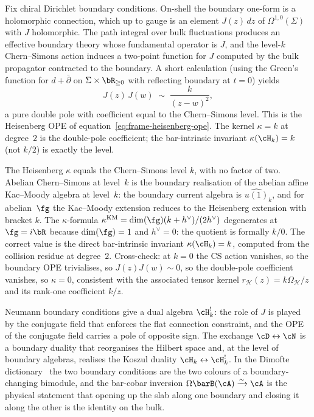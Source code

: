 Fix chiral Dirichlet boundary conditions. On-shell the
boundary one-form is a holomorphic connection, which up to gauge
is an element $J(z)\,dz$ of $\Omega^{1,0}(\Sigma)$ with $J$
holomorphic. The path integral over bulk fluctuations produces an
effective boundary theory whose fundamental operator is $J$, and
the level-$k$ Chern--Simons action induces a two-point function for
$J$ computed by the bulk propagator contracted to the boundary. A
short calculation (using the Green's function for $d + \bar\partial$
on $\Sigma \times \bR_{\ge 0}$ with reflecting boundary at $t = 0$)
yields
\begin{equation}\label{eq:cs-hinge-JJ-OPE}
J(z)\,J(w)
\;\sim\;
\frac{k}{(z - w)^2},
\end{equation}
a pure double pole with coefficient equal to the Chern--Simons
level. This is the Heisenberg OPE of
equation~\eqref{eq:frame-heisenberg-ope}. The kernel
$\kappa = k$ at degree~$2$ is the double-pole coefficient; the
bar-intrinsic invariant $\kappa(\cH_k) = k$ (not $k/2$) is
exactly the level.

\begin{remark}
\label{rem:cs-hinge-level}
The Heisenberg $\kappa$ equals the Chern--Simons level $k$, with
no factor of two. Abelian Chern--Simons at level~$k$ is the
boundary realisation of the abelian affine Kac--Moody algebra at
level~$k$: the boundary current algebra is $\widehat{u(1)}_k$,
and for abelian~$\fg$ the Kac--Moody extension reduces to the
Heisenberg extension with bracket $k$. The $\kappa$-formula
$\kappa^{\mathrm{KM}} = \dim(\fg)(k + h^\vee)/(2 h^\vee)$
degenerates at $\fg = i\bR$ because $\dim(\fg) = 1$ and
$h^\vee = 0$: the quotient is formally $k/0$. The correct value
is the direct bar-intrinsic invariant
$\kappa(\cH_k) = k$, computed from the collision residue at
degree~$2$. Cross-check: at $k = 0$ the CS action vanishes, so
the boundary OPE trivialises, so $J(z) J(w) \sim 0$, so the
double-pole coefficient vanishes, so $\kappa = 0$, consistent
 with the associated tensor kernel
 $r_{\mathcal H}(z)=k\Omega_{\mathcal H}/z$ and its rank-one
 coefficient $k/z$.
\end{remark}

Neumann boundary conditions give a dual algebra $\cH_k^!$: the
role of $J$ is played by the conjugate field that enforces the
flat connection constraint, and the OPE of the conjugate field
carries a pole of opposite sign. The exchange
$\cD \leftrightarrow \cN$ is a boundary duality that reorganises
the Hilbert space and, at the level of boundary algebras,
realises the Koszul duality $\cH_k \leftrightarrow \cH_k^!$.
In the Dimofte dictionary~\cite{CostelloGaiotto2020} the two
boundary conditions are the two colours of a boundary-changing
bimodule, and the bar-cobar inversion
$\Omega\barB(\cA) \xrightarrow{\sim} \cA$ is the physical
statement that opening up the slab along one boundary and
closing it along the other is the identity on the bulk.

